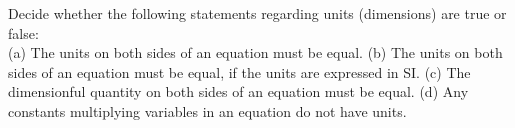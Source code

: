 Decide whether the following statements regarding units (dimensions) are true or false:\\
(a) The units on both sides of an equation must be equal.\hwendpart
(b) The units on both sides of an equation must be equal, if the units are expressed in SI.\hwendpart
(c) The dimensionful quantity on both sides of an equation must be equal.\hwendpart
(d) Any constants multiplying variables in an equation do not have units.\hwendpart
